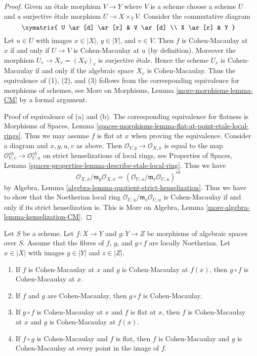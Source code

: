 \begin{proof}
Given an \'etale morphism $V \to Y$ where $V$ is a scheme
choose a scheme $U$ and a surjective \'etale morphism $U \to X \times_Y V$.
Consider the commutative diagram
$$
\xymatrix{
U \ar[d] \ar[r] & V \ar[d] \\
X \ar[r] & Y
}
$$
Let $u \in U$ with images $x \in |X|$, $y \in |Y|$, and $v \in V$.
Then $f$ is Cohen-Macaulay at $x$ if and only if $U \to V$ is
Cohen-Macaulay at $u$ (by definition). Moreover the morphism
$U_v \to X_v = (X_V)_v$ is surjective \'etale. Hence the scheme $U_v$ is
Cohen-Macaulay if and only if the algebraic space $X_v$ is Cohen-Macaulay.
Thus the equivalence of (1), (2), and (3) follows from the
corresponding equivalence for morphisms of
schemes, see More on Morphisms, Lemma \ref{more-morphisms-lemma-CM}
by a formal argument.

\medskip\noindent
Proof of equivalence of (a) and (b). The corresponding equivalence
for flatness is Morphisms of Spaces, Lemma
\ref{spaces-morphisms-lemma-flat-at-point-etale-local-rings}.
Thus we may assume $f$ is flat at $x$ when proving the equivalence.
Consider a diagram and $x, y, u, v$ as above. Then
$\mathcal{O}_{Y, \overline{y}} \to \mathcal{O}_{X, \overline{x}}$
is equal to the map
$\mathcal{O}_{V, v}^{sh} \to \mathcal{O}_{U, u}^{sh}$
on strict henselizations of local rings, see
Properties of Spaces, Lemma
\ref{spaces-properties-lemma-describe-etale-local-ring}.
Thus we have
$$
\mathcal{O}_{X, \overline{x}}/
\mathfrak m_{\overline{y}}\mathcal{O}_{X, \overline{x}} =
(\mathcal{O}_{U, u}/\mathfrak m_v \mathcal{O}_{U, u})^{sh}
$$
by Algebra, Lemma \ref{algebra-lemma-quotient-strict-henselization}.
Thus we have to show that the Noetherian local ring
$\mathcal{O}_{U, u}/\mathfrak m_v \mathcal{O}_{U, u}$
is Cohen-Macaulay if and only if its strict henselization is.
This is More on Algebra, Lemma \ref{more-algebra-lemma-henselization-CM}.
\end{proof}

\begin{lemma}
\label{lemma-composition-CM}
Let $S$ be a scheme.
Let $f : X \to Y$ and $g : Y \to Z$ be morphisms of algebraic spaces
over $S$. Assume that the
fibres of $f$, $g$, and $g \circ f$ are locally Noetherian.
Let $x \in |X|$ with images $y \in |Y|$ and $z \in |Z|$.
\begin{enumerate}
\item If $f$ is Cohen-Macaulay at $x$ and $g$ is Cohen-Macaulay
at $f(x)$, then $g \circ f$ is Cohen-Macaulay at $x$.
\item If $f$ and $g$ are Cohen-Macaulay, then $g \circ f$ is Cohen-Macaulay.
\item If $g \circ f$ is Cohen-Macaulay at $x$ and $f$ is flat at $x$,
then $f$ is Cohen-Macaulay at $x$ and $g$ is Cohen-Macaulay at $f(x)$.
\item If $f \circ g$ is Cohen-Macaulay and $f$ is flat, then
$f$ is Cohen-Macaulay and $g$ is Cohen-Macaulay at every point in
the image of $f$.
\end{enumerate}
\end{lemma}

